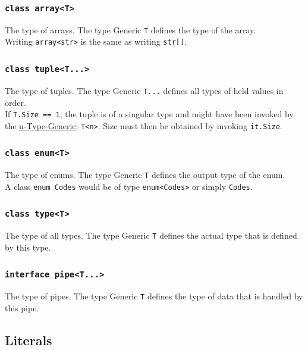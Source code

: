 \documentclass{docs}
\begin{document}
    \label{typeArray}
    \subsubsection{\texttt{class array<T>}}
    The type of arrays. The type Generic \texttt{T} defines the type of the array.
    \\
    Writing \texttt{array<str>} is the same as writing \texttt{str[]}.
    
    \label{typeTuple}
    \subsubsection{\texttt{class tuple<T...>}}
    The type of tuples. The type Generic \texttt{T...} defines all types of held values in order.
    \\
    If \texttt{T.Size == 1}, the tuple is of a singular type and might have been invoked by the \hyperref[typeGenN]{n-Type-Generic}; \texttt{T<n>}.
    Size must then be obtained by invoking \texttt{it.Size}.
    
    \label{typeEnum}
    \subsubsection{\texttt{class enum<T>}}
    The type of enums. The type Generic \texttt{T} defines the output type of the enum.
    \\
    A class \texttt{enum Codes} would be of type \texttt{enum<Codes>} or simply \texttt{Codes}.
    
    \label{typeType}
    \subsubsection{\texttt{class type<T>}}
    The type of all types. The type Generic \texttt{T} defines the actual type that is defined by this type.

    \label{typePipe}
    \subsubsection{\texttt{interface pipe<T...>}}
    The type of pipes. The type Generic \texttt{T} defines the type of data that is handled by this pipe.
    
    \subsection{Literals}
    
    \label{litNull}
\end{document}

